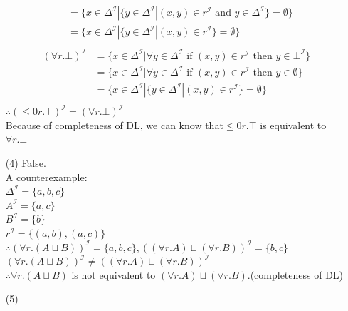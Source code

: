 \documentclass[12pt]{article}
\begin{document}
\begin{enumerate}
\begin{equation}
\begin{aligned}
                &= \{ x \in \Delta^{\mathcal{I}} | \{ y \in \Delta^{\mathcal{I}} | (x, y) \in r^{\mathcal{I}} \text{ and } y \in \Delta^{\mathcal{I}} \} = \emptyset  \} \\
                &= \{ x \in \Delta^{\mathcal{I}} | \{ y \in \Delta^{\mathcal{I}} | (x, y) \in r^{\mathcal{I}} \} = \emptyset  \} \\
            \end{aligned} 
        \end{equation}
        \begin{equation}
            \begin{aligned}
                (\forall r.\bot)^{\mathcal{I}} &= \{ x \in \Delta^{\mathcal{I}} | \forall y \in \Delta^{\mathcal{I}} \text{ if } (x, y) \in r^{\mathcal{I}} \text{ then } y \in \bot^{\mathcal{I}} \} \\
                &= \{ x \in \Delta^{\mathcal{I}} | \forall y \in \Delta^{\mathcal{I}} \text{ if } (x, y) \in r^{\mathcal{I}} \text{ then } y \in \emptyset \} \\
                &= \{ x \in \Delta^{\mathcal{I}} | \{ y \in \Delta^{\mathcal{I}} | (x, y) \in r^{\mathcal{I}} \} = \emptyset  \} \\
            \end{aligned} 
        \end{equation}
        $\therefore (\le 0r.\top)^{\mathcal{I}} = (\forall r.\bot)^{\mathcal{I}}$ \\
        Because of completeness of DL, we can know that$\le 0r.\top$ is equivalent to $\forall r.\bot$
        \item[(4)]
        False. \\
        A counterexample: \\
        $\Delta^{\mathcal{I}} = \{a, b, c\}$ \\
        $A^{\mathcal{I}} = \{a, c\}$ \\
        $B^{\mathcal{I}} = \{b\}$ \\
        $r^{\mathcal{I}} = \{(a, b), (a, c)\}$ \\
        $\therefore (\forall r.(A \sqcup B))^{\mathcal{I}} = \{ a, b, c \},  ((\forall r.A) \sqcup (\forall r.B))^{\mathcal{I}} = \{ b, c \}$ \\
        $(\forall r.(A \sqcup B))^{\mathcal{I}} \neq ((\forall r.A) \sqcup (\forall r.B))^{\mathcal{I}}$ \\
        $\therefore \forall r.(A \sqcup B)$ is not equivalent to $(\forall r.A) \sqcup (\forall r.B)$.(completeness of DL)
        \item[(5)]

\end{enumerate}
\end{document}
